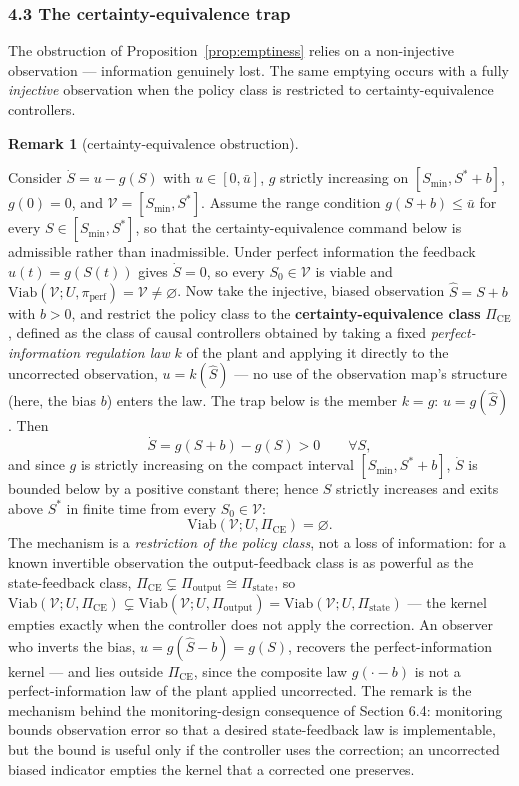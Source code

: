 \documentclass[11pt]{article}
\theoremstyle{definition}
\newtheorem{remark}{Remark}
\begin{document}
\subsubsection{4.3 The certainty-equivalence
trap}\label{the-certainty-equivalence-trap}

The obstruction of Proposition~\ref{prop:emptiness} relies on a non-injective observation ---
information genuinely lost. The same emptying occurs with a fully
\emph{injective} observation when the policy class is restricted to
certainty-equivalence controllers.

\begin{remark}[certainty-equivalence obstruction]\label{rem:ce-trap}

Consider
\(\dot S = u - g(S)\) with \(u \in [0, \bar u]\), \(g\) strictly
increasing on \([S_{\min}, S^* + b]\), \(g(0) = 0\), and
\(\mathcal{V} = [S_{\min}, S^*]\). Assume the range condition
\(g(S + b) \le \bar u\) for every \(S \in [S_{\min}, S^*]\), so that the
certainty-equivalence command below is admissible rather than
inadmissible. Under perfect information the feedback \(u(t) = g(S(t))\)
gives \(\dot S = 0\), so every \(S_0 \in \mathcal{V}\) is viable and
\(\mathrm{Viab}(\mathcal{V}; U, \pi_{\mathrm{perf}}) = \mathcal{V} \neq \varnothing\).
Now take the injective, biased observation \(\hat S = S + b\) with
\(b > 0\), and restrict the policy class to the
\textbf{certainty-equivalence class} \(\Pi_{\mathrm{CE}}\), defined as the class of causal controllers obtained by taking a fixed \emph{perfect-information
regulation law} \(k\) of the plant and applying it directly to the
uncorrected observation, \(u = k(\hat S)\) --- no use of the observation
map's structure (here, the bias \(b\)) enters the law. The trap below is
the member \(k = g\): \(u = g(\hat S)\). Then
\[\dot S = g(S + b) - g(S) > 0 \qquad \forall S,\] and since \(g\) is
strictly increasing on the compact interval \([S_{\min}, S^* + b]\),
\(\dot S\) is bounded below by a positive constant there; hence \(S\)
strictly increases and exits above \(S^*\) in finite time from every
\(S_0 \in \mathcal{V}\):
\[\mathrm{Viab}(\mathcal{V}; U, \Pi_{\mathrm{CE}}) = \varnothing.\] The
mechanism is a \emph{restriction of the policy class}, not a loss of
information: for a known invertible observation the output-feedback
class is as powerful as the state-feedback class,
\(\Pi_{\mathrm{CE}} \subsetneq \Pi_{\mathrm{output}} \cong \Pi_{\mathrm{state}}\),
so
\(\mathrm{Viab}(\mathcal{V}; U, \Pi_{\mathrm{CE}}) \subsetneq \mathrm{Viab}(\mathcal{V}; U, \Pi_{\mathrm{output}}) = \mathrm{Viab}(\mathcal{V}; U, \Pi_{\mathrm{state}})\)
--- the kernel empties exactly when the controller does not apply the correction. An observer who inverts the bias,
\(u = g(\hat S - b) = g(S)\), recovers the perfect-information kernel
--- and lies outside \(\Pi_{\mathrm{CE}}\), since the composite law
\(g(\cdot - b)\) is not a perfect-information law of the plant applied
uncorrected. The remark is the mechanism behind the monitoring-design
consequence of Section 6.4: monitoring bounds observation error so that
a desired state-feedback law is implementable, but the bound is useful
only if the controller uses the correction; an uncorrected biased
indicator empties the kernel that a corrected one preserves.


\end{remark}
\end{document}
